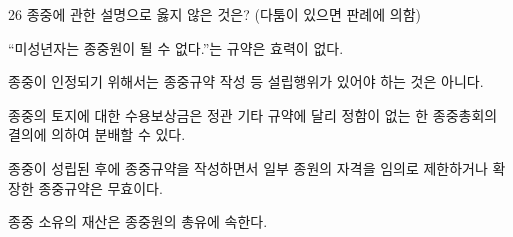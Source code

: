 \begin{question}{26}
종중에 관한 설명으로 옳지 않은 것은? (다툼이 있으면 판례에 의함)
\begin{choices}
  \item “미성년자는 종중원이 될 수 없다.”는 규약은 효력이 없다.
  \item 종중이 인정되기 위해서는 종중규약 작성 등 설립행위가 있어야 하는 것은 아니다.
  \item 종중의 토지에 대한 수용보상금은 정관 기타 규약에 달리 정함이 없는 한 종중총회의 결의에 의하여 분배할 수 있다.
  \item 종중이 성립된 후에 종중규약을 작성하면서 일부 종원의 자격을 임의로 제한하거나 확장한 종중규약은 무효이다.
  \item 종중 소유의 재산은 종중원의 총유에 속한다.
\end{choices}
\end{question}
